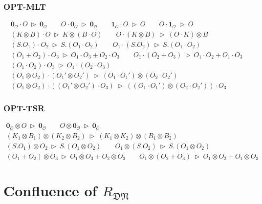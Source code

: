 \documentclass[manuscript, review, timestamp]{acmart}
\newcommand*{\reduce}{\ \triangleright\ }
\begin{document}
\subsubsection*{\textsf{OPT-MLT}}
\begin{gather*}
  \mathbf{0}_\mathcal{O} \cdot O \reduce \mathbf{0}_\mathcal{O}
  \qquad
  O \cdot \mathbf{0}_\mathcal{O} \reduce \mathbf{0}_\mathcal{O}
  \qquad
  \mathbf{1}_\mathcal{O} \cdot O \reduce O
  \qquad
  O \cdot \mathbf{1}_\mathcal{O} \reduce O \\
  (K \otimes B) \cdot O \reduce K \otimes (B \cdot O)
  \qquad
  O \cdot (K \otimes B) \reduce (O \cdot K) \otimes B\\
  (S.O_1) \cdot O_2 \reduce S.(O_1 \cdot O_2)
  \qquad
  O_1 \cdot (S.O_2) \reduce S.(O_1 \cdot O_2) \\
  (O_1 + O_2) \cdot O_3 \reduce O_1 \cdot O_3 + O_2 \cdot O_3
  \qquad
  O_1 \cdot (O_2 + O_3) \reduce O_1 \cdot O_2 + O_1 \cdot O_3 \\
  (O_1 \cdot O_2) \cdot O_3 \reduce O_1 \cdot (O_2 \cdot O_3) \\
  (O_1 \otimes O_2) \cdot (O_1' \otimes O_2') \reduce (O_1 \cdot O_1') \otimes (O_2 \cdot O_2') \\
  (O_1 \otimes O_2) \cdot ((O_1' \otimes O_2') \cdot O_3) \reduce ((O_1 \cdot O_1') \otimes (O_2 \cdot O_2')) \cdot O_3
\end{gather*}


\subsubsection*{\textsf{OPT-TSR}}
\begin{gather*}
  \mathbf{0}_\mathcal{O} \otimes O \reduce \mathbf{0}_\mathcal{O}
  \qquad
  O \otimes \mathbf{0}_\mathcal{O} \reduce \mathbf{0}_\mathcal{O} \\
  (K_1 \otimes B_1) \otimes (K_2 \otimes B_2) \reduce (K_1 \otimes K_2) \otimes (B_1 \otimes B_2) \\
  (S.O_1) \otimes O_2 \reduce S.(O_1 \otimes O_2)
  \qquad
  O_1 \otimes (S.O_2) \reduce S.(O_1 \otimes O_2) \\
  (O_1 + O_2) \otimes O_3 \reduce O_1 \otimes O_3 + O_2 \otimes O_3
  \qquad
  O_1 \otimes (O_2 + O_3) \reduce O_1 \otimes O_2 + O_1 \otimes O_3
\end{gather*}


\section{Confluence of $R_\mathfrak{DN}$}
\end{document}
